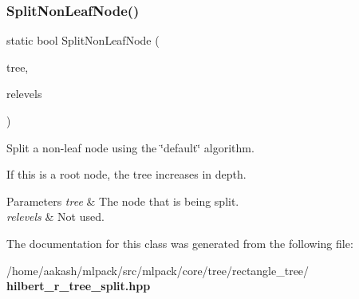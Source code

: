 \subsubsection{Split\+Non\+Leaf\+Node()}
{\footnotesize\ttfamily static bool Split\+Non\+Leaf\+Node (\begin{DoxyParamCaption}\item[{Tree\+Type $\ast$}]{tree,  }\item[{std\+::vector$<$ bool $>$ \&}]{relevels }\end{DoxyParamCaption})\hspace{0.3cm}{\ttfamily [static]}}



Split a non-\/leaf node using the \char`\"{}default\char`\"{} algorithm. 

If this is a root node, the tree increases in depth.


\begin{DoxyParams}{Parameters}
{\em tree} & The node that is being split. \\
\hline
{\em relevels} & Not used. \\
\hline
\end{DoxyParams}


The documentation for this class was generated from the following file\+:\begin{DoxyCompactItemize}
\item 
/home/aakash/mlpack/src/mlpack/core/tree/rectangle\+\_\+tree/\textbf{ hilbert\+\_\+r\+\_\+tree\+\_\+split.\+hpp}\end{DoxyCompactItemize}
